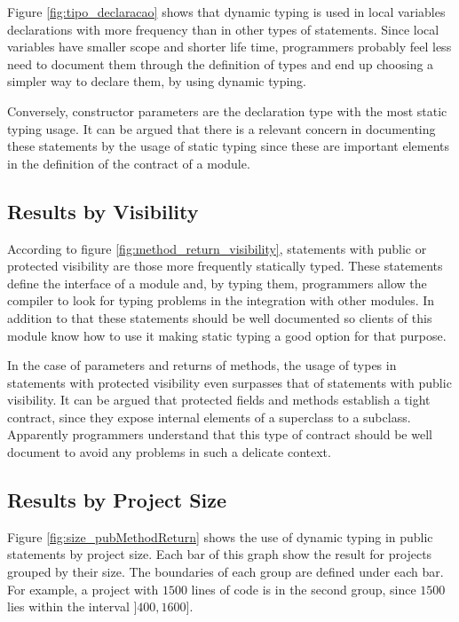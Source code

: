 \documentclass[preprint]{sigplanconf}
\begin{document}
Figure \ref{fig:tipo_declaracao} shows that dynamic typing is used in local variables declarations with more frequency than in other types of statements.
Since local variables have smaller scope and shorter life time, programmers probably feel less need to document them through the definition of types and end up choosing a simpler way to declare them, by using dynamic typing.

Conversely, constructor parameters are the declaration type with the most static typing usage.
It can be argued that there is a relevant concern in documenting these statements by the usage of static typing since these are important elements in the definition of the contract of a module.

\subsection{Results by Visibility\label{sub:visibility-results}}
According to figure \ref{fig:method_return_visibility}, statements with public or protected visibility are those more frequently statically typed. 
These statements define the interface of a module and, by typing them, programmers allow the compiler to look for typing problems in the integration with other modules.
In addition to that these statements should be well documented so clients of this module know how to use it making static typing a good option for that purpose.

In the case of parameters and returns of methods, the usage of types in statements with protected visibility even surpasses that of statements with public visibility.
It can be argued that protected fields and methods establish a tight contract, since they expose internal elements of a superclass to a subclass.
Apparently programmers understand that this type of contract should be well document to avoid any problems in such a delicate context.

\subsection{Results by Project Size\label{sub:size-results}}
Figure \ref{fig:size_pubMethodReturn} shows the use of dynamic typing in public statements by project size. 
Each bar of this graph show the result for projects grouped by their size.
The boundaries of each group are defined under each bar.
For example, a project with $1500$ lines of code is in the second group, since $1500$ lies within the interval $]400, 1600]$.
\end{document}
